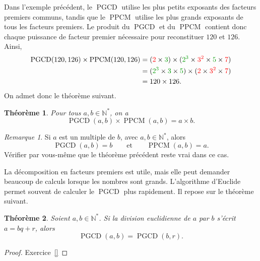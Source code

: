 \documentclass[12pt,a4paper]{article}
\theoremstyle{plain}
\newtheorem{theorem}{Théorème}[section]
\theoremstyle{definition}
\theoremstyle{remark}
\newtheorem*{remark}{Remarque}
\DeclareMathOperator{\ppcm}{PPCM}
\DeclareMathOperator{\pgcd}{PGCD}
\begin{document}
Dans l'exemple précédent, le $\pgcd$ utilise les plus petits exposants des
facteurs premiers communs, tandis que le $\ppcm$ utilise les plus grands
exposants de tous les facteurs premiers. Le produit du $\pgcd$ 
et du $\ppcm$ contient donc chaque puissance de facteur premier nécessaire pour 
reconstituer $120$ et $126$. Ainsi,
\[
  \begin{aligned}
    \pgcd(120,126)\times\ppcm(120,126)
    &= (\textcolor{red}{2}\times\textcolor{green!60!black}{3})
       \times(\textcolor{green!60!black}{2^3}\times\textcolor{red}{3^2}
       \times\textcolor{green!60!black}{5}\times\textcolor{red}{7})\\
    &= (\textcolor{green!60!black}{2^3}\times\textcolor{green!60!black}{3}
       \times\textcolor{green!60!black}{5})
       \times(\textcolor{red}{2}\times\textcolor{red}{3^2}
       \times\textcolor{red}{7})\\
    &=120\times126.
  \end{aligned}
\]
On admet donc le théorème suivant.

\begin{tcolorbox}[navybar]
  \begin{theorem}
    Pour tous $a,b\in\mathbb{N}^*$, on a
    \[
      \pgcd(a,b)\times\ppcm(a,b)=a\times b.
    \]
  \end{theorem}
\end{tcolorbox}

\begin{remark}
  Si $a$ est un multiple de $b$, avec $a,b\in\mathbb{N}^*$, alors
  \[
    \pgcd(a,b)=b\qquad\text{et}\qquad\ppcm(a,b)=a.
  \]
  Vérifier par vous-même que le théorème précédent reste vrai dans ce cas.
\end{remark}

La décomposition en facteurs premiers est utile, mais elle peut demander
beaucoup de calculs lorsque les nombres sont grands.
L'algorithme d'Euclide permet souvent de calculer le $\pgcd$ plus rapidement.
Il repose sur le théorème suivant.

\begin{tcolorbox}[navybar]
  \begin{theorem}
    Soient $a,b\in\mathbb{N}^*$. Si la division euclidienne de $a$ par $b$
    s'écrit $a = bq + r$, alors
    \[
      \pgcd(a,b)=\pgcd(b,r).
    \]
  \end{theorem}
\end{tcolorbox}

\begin{proof}
  Exercice~\ref{}
\end{proof}
\end{document}
